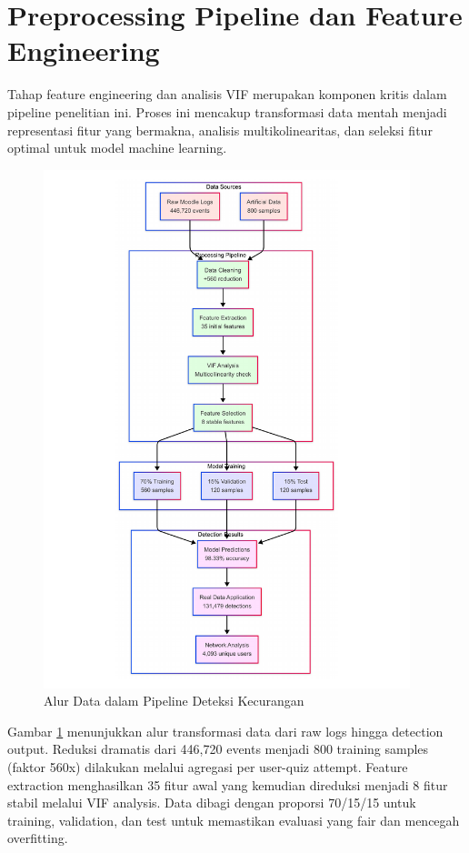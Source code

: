 \section{Preprocessing Pipeline dan Feature Engineering}
\label{sec:preprocessingPipelineFeatureEngineering}
Tahap feature engineering dan analisis VIF merupakan komponen kritis dalam pipeline penelitian ini. Proses ini mencakup transformasi data mentah menjadi representasi fitur yang bermakna, analisis multikolinearitas, dan seleksi fitur optimal untuk model machine learning. 

\begin{figure}[htbp]
    \centering
    \includegraphics[width=0.95\textwidth]{figures/data_flow_diagram.pdf}
    \caption{Alur Data dalam Pipeline Deteksi Kecurangan}
    \label{fig:data_flow}
\end{figure}

Gambar \ref{fig:data_flow} menunjukkan alur transformasi data dari raw logs hingga detection output. Reduksi dramatis dari 446,720 events menjadi 800 training samples (faktor 560x) dilakukan melalui agregasi per user-quiz attempt. Feature extraction menghasilkan 35 fitur awal yang kemudian direduksi menjadi 8 fitur stabil melalui VIF analysis. Data dibagi dengan proporsi 70/15/15 untuk training, validation, dan test untuk memastikan evaluasi yang fair dan mencegah overfitting.

